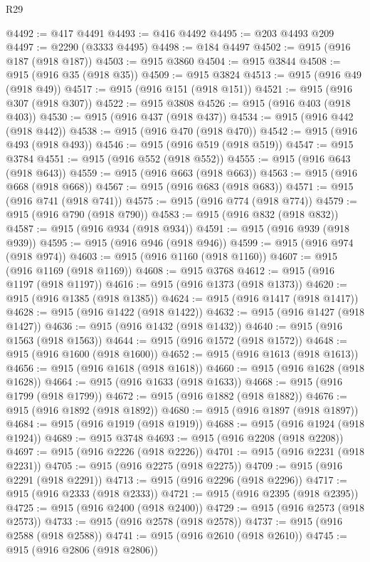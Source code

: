 \begin{lexlean}{R29}
\begin{coremodule}
@4492 := @417 @4491
@4493 := @416 @4492
@4495 := @203 @4493 @209
@4497 := @2290 (@3333 @4495)
@4498 := @184 @4497
@4502 := @915 (@916 @187 (@918 @187))
@4503 := @915 @3860
@4504 := @915 @3844
@4508 := @915 (@916 @35 (@918 @35))
@4509 := @915 @3824
@4513 := @915 (@916 @49 (@918 @49))
@4517 := @915 (@916 @151 (@918 @151))
@4521 := @915 (@916 @307 (@918 @307))
@4522 := @915 @3808
@4526 := @915 (@916 @403 (@918 @403))
@4530 := @915 (@916 @437 (@918 @437))
@4534 := @915 (@916 @442 (@918 @442))
@4538 := @915 (@916 @470 (@918 @470))
@4542 := @915 (@916 @493 (@918 @493))
@4546 := @915 (@916 @519 (@918 @519))
@4547 := @915 @3784
@4551 := @915 (@916 @552 (@918 @552))
@4555 := @915 (@916 @643 (@918 @643))
@4559 := @915 (@916 @663 (@918 @663))
@4563 := @915 (@916 @668 (@918 @668))
@4567 := @915 (@916 @683 (@918 @683))
@4571 := @915 (@916 @741 (@918 @741))
@4575 := @915 (@916 @774 (@918 @774))
@4579 := @915 (@916 @790 (@918 @790))
@4583 := @915 (@916 @832 (@918 @832))
@4587 := @915 (@916 @934 (@918 @934))
@4591 := @915 (@916 @939 (@918 @939))
@4595 := @915 (@916 @946 (@918 @946))
@4599 := @915 (@916 @974 (@918 @974))
@4603 := @915 (@916 @1160 (@918 @1160))
@4607 := @915 (@916 @1169 (@918 @1169))
@4608 := @915 @3768
@4612 := @915 (@916 @1197 (@918 @1197))
@4616 := @915 (@916 @1373 (@918 @1373))
@4620 := @915 (@916 @1385 (@918 @1385))
@4624 := @915 (@916 @1417 (@918 @1417))
@4628 := @915 (@916 @1422 (@918 @1422))
@4632 := @915 (@916 @1427 (@918 @1427))
@4636 := @915 (@916 @1432 (@918 @1432))
@4640 := @915 (@916 @1563 (@918 @1563))
@4644 := @915 (@916 @1572 (@918 @1572))
@4648 := @915 (@916 @1600 (@918 @1600))
@4652 := @915 (@916 @1613 (@918 @1613))
@4656 := @915 (@916 @1618 (@918 @1618))
@4660 := @915 (@916 @1628 (@918 @1628))
@4664 := @915 (@916 @1633 (@918 @1633))
@4668 := @915 (@916 @1799 (@918 @1799))
@4672 := @915 (@916 @1882 (@918 @1882))
@4676 := @915 (@916 @1892 (@918 @1892))
@4680 := @915 (@916 @1897 (@918 @1897))
@4684 := @915 (@916 @1919 (@918 @1919))
@4688 := @915 (@916 @1924 (@918 @1924))
@4689 := @915 @3748
@4693 := @915 (@916 @2208 (@918 @2208))
@4697 := @915 (@916 @2226 (@918 @2226))
@4701 := @915 (@916 @2231 (@918 @2231))
@4705 := @915 (@916 @2275 (@918 @2275))
@4709 := @915 (@916 @2291 (@918 @2291))
@4713 := @915 (@916 @2296 (@918 @2296))
@4717 := @915 (@916 @2333 (@918 @2333))
@4721 := @915 (@916 @2395 (@918 @2395))
@4725 := @915 (@916 @2400 (@918 @2400))
@4729 := @915 (@916 @2573 (@918 @2573))
@4733 := @915 (@916 @2578 (@918 @2578))
@4737 := @915 (@916 @2588 (@918 @2588))
@4741 := @915 (@916 @2610 (@918 @2610))
@4745 := @915 (@916 @2806 (@918 @2806))

\end{coremodule}
\end{lexlean}
